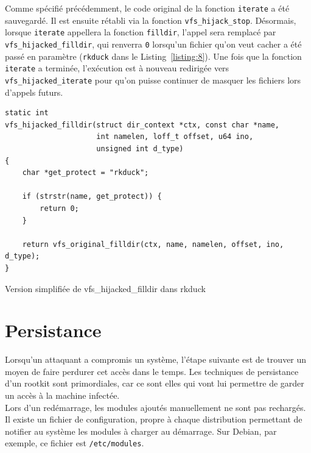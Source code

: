 \documentclass[12pt]{article}
\begin{document}
        Comme spécifié précédemment, le code original de la fonction \texttt{iterate} a été sauvegardé. Il est ensuite rétabli via la fonction \texttt{vfs\_hijack\_stop}. Désormais, lorsque \texttt{iterate} appellera la fonction \texttt{filldir}, l'appel sera remplacé par \texttt{vfs\_hijacked\_filldir}, qui renverra \texttt{0} lorsqu'un fichier qu'on veut cacher a été passé en paramètre (\texttt{rkduck} dans le Listing~\ref{listing:8}). Une fois que la fonction \texttt{iterate} a terminée, l'exécution est à nouveau redirigée vers \texttt{vfs\_hijacked\_iterate} pour qu'on puisse continuer de masquer les fichiers lors d'appels futurs.\\

\begin{listing}[H]
\begin{verbatim}
static int 
vfs_hijacked_filldir(struct dir_context *ctx, const char *name, 
                     int namelen, loff_t offset, u64 ino, 
                     unsigned int d_type) 
{
    char *get_protect = "rkduck";
    
    if (strstr(name, get_protect)) {
        return 0;
    }

    return vfs_original_filldir(ctx, name, namelen, offset, ino, d_type);
}
\end{verbatim}
\caption{Version simplifiée de vfs\_hijacked\_filldir dans rkduck}
\label{listing:8}
\end{listing}


\section{Persistance}

    Lorsqu'un attaquant a compromis un système, l'étape suivante est de trouver un moyen de faire perdurer cet accès dans le temps. Les techniques de persistance d'un rootkit sont primordiales, car ce sont elles qui vont lui permettre de garder un accès à la machine infectée. \\ 

    Lors d'un redémarrage, les modules ajoutés manuellement ne sont pas rechargés. Il existe un fichier de configuration, propre à chaque distribution permettant de notifier au système les modules à charger au démarrage. Sur Debian, par exemple, ce fichier est \texttt{/etc/modules}. \\
\end{document}
